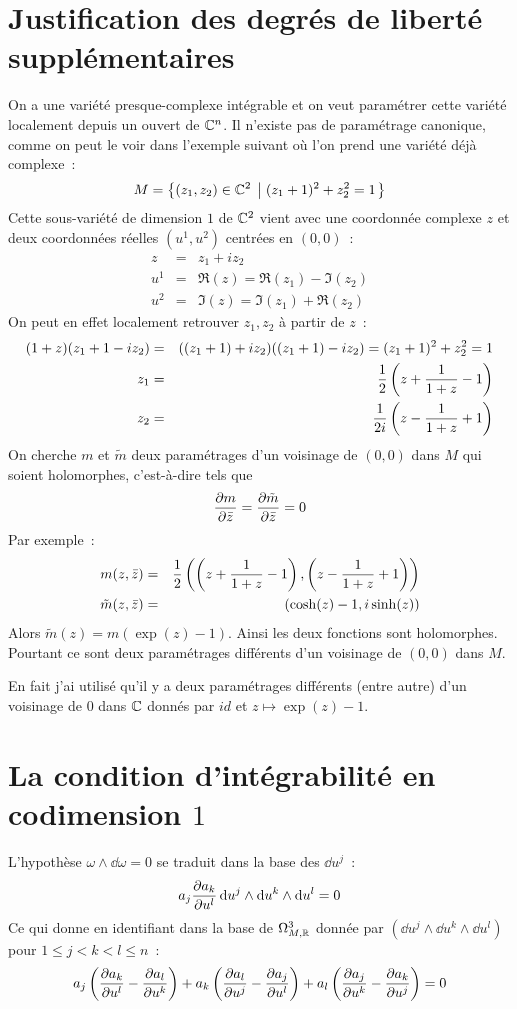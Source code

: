 \documentclass[a4paper,draft]{amsart}
\begin{document}
\pagebreak
\appendix
\section{Justification des degrés de liberté supplémentaires}\label{liberte}
On a une variété presque-complexe intégrable et on veut paramétrer cette variété localement depuis un ouvert de $\mathbb{C}^n$. Il n'existe pas de paramétrage canonique, comme on peut le voir dans l'exemple suivant où l'on prend une variété déjà complexe~:
\[
M = \left\lbrace {(z_1,z_2) \in \mathbb{C}^2} \; \left| \; {(z_1+1)^2 + z_2^2 = 1} \right. \right\rbrace
\]
Cette sous-variété de dimension $1$ de $\mathbb{C}^2$ vient avec une coordonnée complexe $z$ et deux coordonnées réelles $(u^1,u^2)$ centrées en $(0,0)$~:
\begin{eqnarray*}
z &=& z_1 + i z_2 \\
u^1 &=& \Re(z) = \Re(z_1) - \Im(z_2) \\
u^2 &=& \Im(z) = \Im(z_1) + \Re(z_2)
\end{eqnarray*}
On peut en effet localement retrouver $z_1,z_2$ à partir de $z$~:
\begin{eqnarray*}
(1+z)(z_1+1-iz_2) &=& ((z_1+1)+iz_2)((z_1+1)-iz_2) = (z_1+1)^2 + z_2^2 = 1\\
z_1 &=& \operatorname{\frac{1}{2}}\left(
z + \dfrac{1}{1+z} - 1
\right)\\
z_2 &=& \dfrac{1}{2i}\left(
z - \dfrac{1}{1+z} + 1
\right)
\end{eqnarray*}
On cherche $m$ et $\tilde{m}$ deux paramétrages d'un voisinage de $(0,0)$ dans $M$ qui soient holomorphes, c'est-à-dire tels que \[
\dfrac{\partial{m}}{\partial{\bar{z}}} = \dfrac{\partial{\tilde{m}}}{\partial{\bar{z}}} = 0
\]
Par exemple~:
\begin{eqnarray*}
m(z,\bar{z}) &=& \operatorname{\frac{1}{2}}\left(\left(
z + \dfrac{1}{1+z} - 1
\right), \left(
z - \dfrac{1}{1+z} + 1
\right)\right)\\
\tilde{m}(z,\bar{z}) &=& (\cosh(z)-1,i\sinh(z))
\end{eqnarray*}
Alors $\tilde{m}(z) = m(\exp(z)-1)$. Ainsi les deux fonctions sont holomorphes. Pourtant ce sont deux paramétrages différents d'un voisinage de $(0,0)$ dans $M$.

En fait j'ai utilisé qu'il y a deux paramétrages différents (entre autre) d'un voisinage de $0$ dans $\mathbb{C}$ donnés par $id$ et $z \mapsto \exp(z)-1$.

\section{La condition d'intégrabilité en codimension $1$}
L'hypothèse $\omega \wedge \dd \omega = 0$ se traduit dans la base des $\dd u^j$~:
\[
a_j\dfrac{\partial{a_k}}{\partial{u^l}} \operatorname{d\!} u^j \wedge \operatorname{d\!} u^k \wedge \operatorname{d\!} u^l = 0
\]
Ce qui donne en identifiant dans la base de $\Omega^3_{M,\mathbb{R}}$ donnée par $(\dd u^j \wedge \dd u^k \wedge \dd u^l)$ pour $1 \leq j <k <l \leq n$~:
\[
a_j \left(\dfrac{\partial{a_k}}{\partial{u^l}} - \dfrac{\partial{a_l}}{\partial{u^k}} \right)+a_k \left(\dfrac{\partial{a_l}}{\partial{u^j}} - \dfrac{\partial{a_j}}{\partial{u^l}} \right)+a_l \left(\dfrac{\partial{a_j}}{\partial{u^k}} - \dfrac{\partial{a_k}}{\partial{u^j}} \right) = 0
\]
\end{document}
